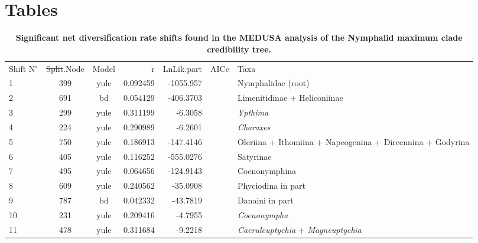 \documentclass[10pt]{article}
\providecommand{\DIFaddtex}[1]{{\protect\color{blue}\uwave{#1}}} %
\providecommand{\DIFdeltex}[1]{{\protect\color{red}\sout{#1}}}                      %
\providecommand{\DIFaddFL}[1]{\DIFadd{#1}} %
\providecommand{\DIFdelFL}[1]{\DIFdel{#1}} %
\providecommand{\DIFaddbeginFL}{} %
\providecommand{\DIFaddendFL}{} %
\providecommand{\DIFdelbeginFL}{} %
\providecommand{\DIFdelendFL}{} %
\providecommand{\DIFadd}[1]{\texorpdfstring{\DIFaddtex{#1}}{#1}} %
\providecommand{\DIFdel}[1]{\texorpdfstring{\DIFdeltex{#1}}{}} %
\begin{document}
\section*{Tables}
\begin{table}[!h]
\caption{\bf{Significant net diversification rate shifts found in the MEDUSA analysis of the Nymphalid maximum clade credibility tree.}}
\begin{tabular}{lccrrcl}
Shift N$^\circ$ & \DIFdelbeginFL \DIFdelFL{Split}\DIFdelendFL \DIFaddbeginFL \DIFaddFL{Shift}\DIFaddendFL .Node & Model & r          & LnLik.part & AICc     & Taxa                                                       \\
1               & 399        & yule  & 0.092459   & -1055.957  &          & Nymphalidae (root)                                         \\
2               & 691        & bd    & 0.054129   & -406.3703  &          & Limenitidinae + Heliconiinae                               \\
3               & 299        & yule  & 0.311199   & -6.3058    &          & \emph{Ypthima}                                             \\
4               & 224        & yule  & 0.290989   & -6.2601    &          & \emph{Charaxes}                                            \\
5               & 750        & yule  & 0.186913   & -147.4146  &          & Oleriina + Ithomiina + Napeogenina + Dircennina + Godyrina \\
6               & 405        & yule  & 0.116252   & -555.0276  &          & Satyrinae                                                   \\
7               & 495        & yule  & 0.064656   & -124.9143  &          & Coenonymphina                                              \\
8               & 609        & yule  & 0.240562   & -35.0908   &          & Phyciodina in part                                         \\
9               & 787        & bd    & 0.042332   & -43.7819   &          & Danaini in part                                            \\
10              & 231        & yule  & 0.209416   & -4.7955    &          & \emph{Coenonympha}                                         \\
11              & 478        & yule  & 0.311684   & -9.2218    &          & \emph{Caeruleuptychia} + \emph{Magneuptychia}              \\

\end{tabular}
\end{table}
\end{document}
